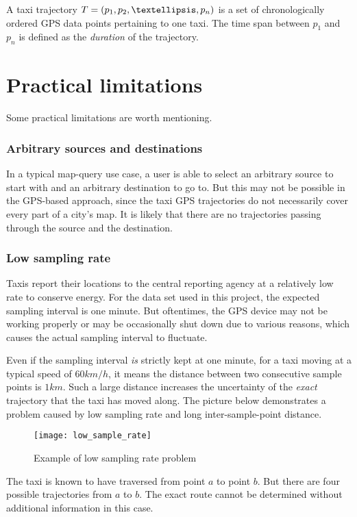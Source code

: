 \begin{defn}\label{Def: trajectory}
A taxi trajectory $T = (p_1,p_2,\textellipsis,p_n)$ is a set of chronologically ordered GPS data points pertaining to one taxi. The time span between $p_1$ and $p_n$ is defined as the \emph{duration} of the trajectory. 
\end{defn}

\section{Practical limitations} \label{Sec:limitation}
Some practical limitations are worth mentioning. 
\subsubsection{Arbitrary sources and destinations}
In a typical map-query use case, a user is able to select an arbitrary source to start with and an arbitrary destination to go to. But this may not be possible in the GPS-based approach, since the taxi GPS trajectories do not necessarily cover every part of a city's map. It is likely that there are no trajectories passing through the source and the destination.
\subsubsection{Low sampling rate}
Taxis report their locations to the central reporting agency at a relatively low rate to conserve energy. For the data set used in this project, the expected sampling interval is one minute. But oftentimes, the GPS device may not be working properly or may be occasionally shut down due to various reasons, which causes the actual sampling interval to fluctuate. 

Even if the sampling interval \emph{is} strictly kept at one minute, for a taxi moving at a typical speed of $60km/h$, it means the distance between two consecutive sample points is $1km$. Such a large distance increases the uncertainty of the \emph{exact} trajectory that the taxi has moved along. The picture\cite{TDR10} below demonstrates a problem caused by low sampling rate and long inter-sample-point distance.
\begin{figure}[h]
\texttt{[image: low\_sample\_rate]}
\centering
\caption{Example of low sampling rate problem}
\end{figure}

The taxi is known to have traversed from point $a$ to point $b$. But there are four possible trajectories from $a$ to $b$. The exact route cannot be determined without additional information in this case.
